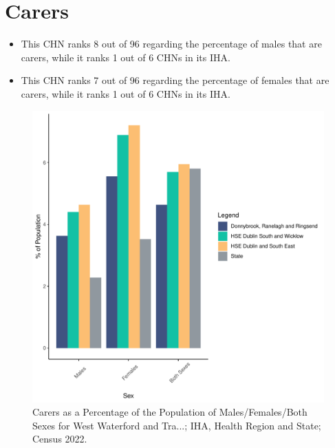 \documentclass{article}
\begin{document}
\section{Carers}\label{sect:Carers}
\begin{itemize}
\item This CHN ranks  8 out of 96 regarding the percentage of males that are carers, while it ranks   1 out of 6 CHNs in its IHA.
\item This CHN ranks  7 out of 96 regarding the percentage of females that are carers, while it ranks   1 out of 6 CHNs in its IHA.
\end{itemize}
\begin{figure}[H]
	\centering
	\includegraphics[width = 150mm]{../figures/CareED.pdf}
	\caption{Carers as a Percentage of the Population of Males/Females/Both Sexes for West Waterford and Tra...; IHA, Health Region and State; Census 2022.}
	\label{fig:2ae19629-1a6a-13a3-e055-000000000001}
	\end{figure}
\end{document}
